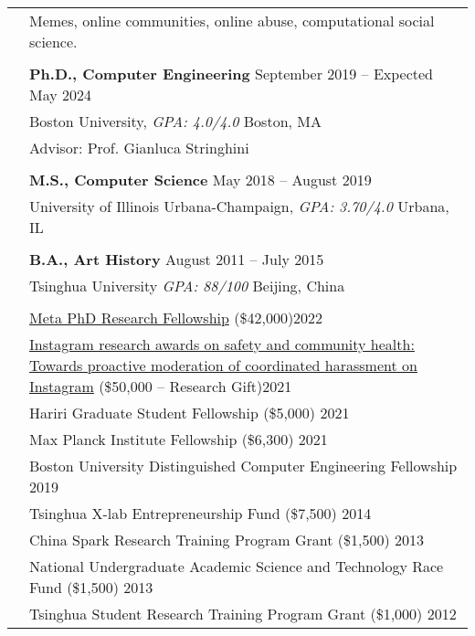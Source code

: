 \documentclass[letterpaper, 11pt]{article}
\begin{document}
\begin{longtable}{p{1.3in}p{4.8in}}


\nohyphens{\color{OliveGreen}{Research interests}}
& Memes, online communities, online abuse, computational social science.\\
& \\


\color{OliveGreen}{Education} 
& \textbf{Ph.D., Computer Engineering} \hfill September 2019 -- Expected May 2024 \\ 
& Boston University, {\it GPA: 4.0/4.0} \hfill Boston, MA \\
& Advisor: Prof. Gianluca Stringhini\\
& \\

& \textbf{M.S., Computer Science} \hfill May 2018 -- August 2019 \\
& University of Illinois Urbana-Champaign, {\it GPA: 3.70/4.0}  \hfill Urbana, IL\\
& \\

& \textbf{B.A., Art History} \hfill August 2011 -- July 2015\\
& Tsinghua University {\it GPA: 88/100} \hfill Beijing, China\\
& \\

{\color{OliveGreen}{Research Funding}}
& \href{https://research.facebook.com/blog/2022/2/announcing-the-recipients-of-the-2022-meta-phd-research-fellowship/}{Meta PhD Research Fellowship} (\$42,000)\hfill 2022\\
& \href{https://research.facebook.com/blog/2021/12/announcing-the-recipients-of-instagram-research-awards-on-safety-and-community-health/}{ Instagram research awards on safety and community health: Towards proactive moderation of coordinated harassment on Instagram} (\$50,000 – Research Gift)\hfill 2021\\
& Hariri Graduate Student Fellowship (\$5,000) \hfill 2021\\
& Max Planck Institute Fellowship (\$6,300) \hfill 2021\\
& Boston University Distinguished Computer Engineering Fellowship \hfill 2019\\
& Tsinghua X-lab Entrepreneurship Fund (\$7,500) \hfill2014\\
& China Spark Research Training Program Grant (\$1,500) \hfill 2013\\
& National Undergraduate Academic Science and Technology Race Fund (\$1,500) \hfill2013\\
& Tsinghua Student Research Training Program Grant (\$1,000) \hfill2012\\


\end{longtable}
\end{document}
